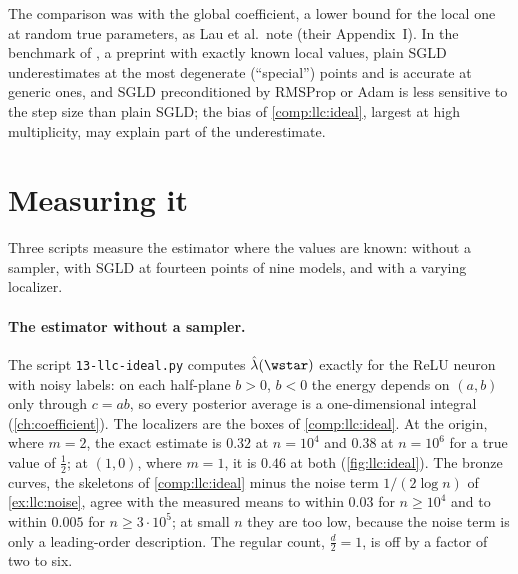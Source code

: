 \begin{refsection}
The comparison was with the global coefficient, a lower bound for the local one at random true parameters, as Lau et al.\ note (their Appendix~I). In the benchmark of \textcite{HitchcockHoogland2025}, a preprint with exactly known local values, plain SGLD underestimates at the most degenerate (``special'') points and is accurate at generic ones, and SGLD preconditioned by RMSProp or Adam is less sensitive to the step size than plain SGLD; the bias of \cref{comp:llc:ideal}, largest at high multiplicity, may explain part of the underestimate.

\section{Measuring it}\label{sec:llc:measuring}

Three scripts measure the estimator where the values are known: without a sampler, with SGLD at fourteen points of nine models, and with a varying localizer.

\paragraph{The estimator without a sampler.} The script \texttt{13-llc-ideal.py} computes $\hat\lambda(\wstar)$ exactly for the ReLU neuron with noisy labels: on each half-plane $b>0$, $b<0$ the energy depends on $(a,b)$ only through $c=ab$, so every posterior average is a one-dimensional integral (\cref{ch:coefficient}). The localizers are the boxes of \cref{comp:llc:ideal}. At the origin, where $m=2$, the exact estimate is $0.32$ at $n=10^4$ and $0.38$ at $n=10^6$ for a true value of $\tfrac12$; at $(1,0)$, where $m=1$, it is $0.46$ at both (\cref{fig:llc:ideal}). The bronze curves, the skeletons of \cref{comp:llc:ideal} minus the noise term $1/(2\log n)$ of \cref{ex:llc:noise}, agree with the measured means to within $0.03$ for $n\ge10^4$ and to within $0.005$ for $n\ge3\cdot10^5$; at small $n$ they are too low, because the noise term is only a leading-order description. The regular count, $\tfrac d2=1$, is off by a factor of two to six.


\end{refsection}
